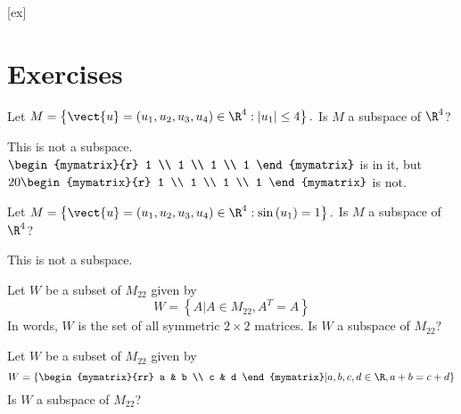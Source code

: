 [ex]
\section*{Exercises}

\begin{enumialphparenastyle}

\begin{ex} Let $M=\left\{ \vect{u}=\left( u_{1},u_{2},u_{3},u_{4}\right) \in 
\R^{4}:\left| u_{1}\right| \leq 4\right\} .$ Is $M$ a subspace of $\R^4$?
\begin{sol}
This is not a subspace. $\begin{mymatrix}{r}
1 \\
1 \\
1 \\
1
\end{mymatrix} $ is in
it, but $20\begin{mymatrix}{r}
1 \\
1 \\
1 \\
1
\end{mymatrix} $ is not. 
\end{sol}
\end{ex}

\begin{ex} Let $M=\left\{ \vect{u}=\left( u_{1},u_{2},u_{3},u_{4}\right) \in 
\R^{4}:\sin \left( u_{1}\right) =1\right\} .$ Is $M$ a subspace of $\R^4$?
\begin{sol}
This is not a subspace.
\end{sol}
\end{ex}

\begin{ex} Let $W$ be a subset of $M_{22}$ given by 
\[
W = \left\{ A | A \in M_{22}, A^T = A \right\}  
\]
In words, $W$ is the set of all symmetric $2 \times 2$ matrices. Is $W$ a subspace of $M_{22}$?
\end{ex}

\begin{ex} Let $W$ be a subset of $M_{22}$ given by 
\[
W = \left\{ \begin{mymatrix}{rr}
a  & b \\
c & d 
\end{mymatrix} | a,b,c,d \in \R, a + b = c + d \right\}
\]
Is $W$ a subspace of $M_{22}$?
\end{ex}


\end{enumialphparenastyle}
